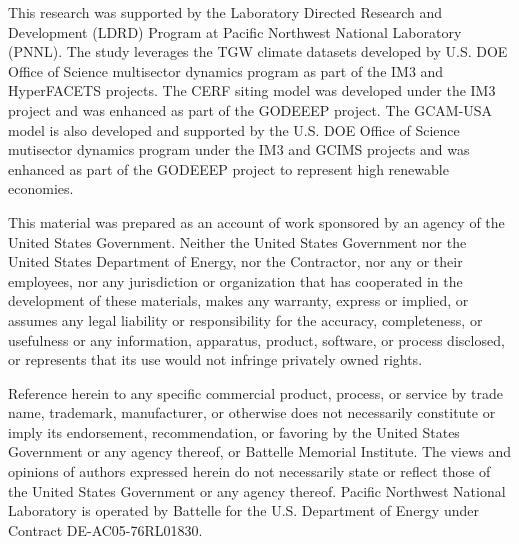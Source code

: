 \documentclass{agujournal2019}
\begin{document}
\acknowledgments
This research was supported by the Laboratory Directed Research and Development (LDRD) Program at Pacific Northwest National Laboratory (PNNL). The study leverages the TGW climate datasets developed by U.S. DOE Office of Science multisector dynamics program as part of the IM3 and HyperFACETS projects. The CERF siting model was developed under the IM3 project and was enhanced as part of the GODEEEP project. The GCAM-USA model is also developed and supported by the U.S. DOE Office of Science mutisector dynamics program under the IM3 and GCIMS projects and was enhanced as part of the GODEEEP project to represent high renewable economies.

This material was prepared as an account of work sponsored by an agency of the United States Government.  Neither the United States Government nor the United States Department of Energy, nor the Contractor, nor any or their employees, nor any jurisdiction or organization that has cooperated in the development of these materials, makes any warranty, express or implied, or assumes any legal liability or responsibility for the accuracy, completeness, or usefulness or any information, apparatus, product, software, or process disclosed, or represents that its use would not infringe privately owned rights.

Reference herein to any specific commercial product, process, or service by trade name, trademark, manufacturer, or otherwise does not necessarily constitute or imply its endorsement, recommendation, or favoring by the United States Government or any agency thereof, or Battelle Memorial Institute. The views and opinions of authors expressed herein do not necessarily state or reflect those of the United States Government or any agency thereof.  Pacific Northwest National Laboratory is operated by Battelle for the U.S. Department of Energy under Contract DE-AC05-76RL01830. 


%
%




%
%
%
%
\end{document}
